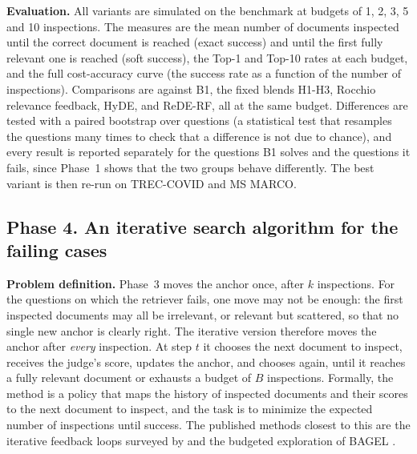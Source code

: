 \documentclass[12pt,a4paper]{article}
\begin{document}
\textbf{Evaluation.} All variants are simulated on the benchmark at budgets of 1, 2, 3, 5 and 10 inspections. The measures are the mean number of documents inspected until the correct document is reached (exact success) and until the first fully relevant one is reached (soft success), the Top-1 and Top-10 rates at each budget, and the full cost-accuracy curve (the success rate as a function of the number of inspections). Comparisons are against B1, the fixed blends H1-H3, Rocchio relevance feedback, HyDE, and ReDE-RF, all at the same budget. Differences are tested with a paired bootstrap over questions (a statistical test that resamples the questions many times to check that a difference is not due to chance), and every result is reported separately for the questions B1 solves and the questions it fails, since Phase~1 shows that the two groups behave differently. The best variant is then re-run on TREC-COVID and MS MARCO.

\subsection{Phase 4. An iterative search algorithm for the failing cases}

\textbf{Problem definition.} Phase~3 moves the anchor once, after $k$ inspections. For the questions on which the retriever fails, one move may not be enough: the first inspected documents may all be irrelevant, or relevant but scattered, so that no single new anchor is clearly right. The iterative version therefore moves the anchor after \emph{every} inspection. At step $t$ it chooses the next document to inspect, receives the judge's score, updates the anchor, and chooses again, until it reaches a fully relevant document or exhausts a budget of $B$ inspections. Formally, the method is a policy that maps the history of inspected documents and their scores to the next document to inspect, and the task is to minimize the expected number of inspections until success. The published methods closest to this are the iterative feedback loops surveyed by \citet{feedback2025survey} and the budgeted exploration of BAGEL \citep{bagel2026}.
\end{document}
